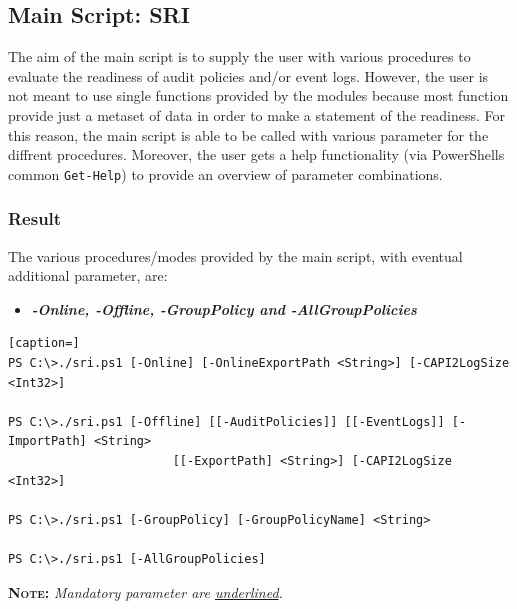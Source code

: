 \clearpage

\subsection{Main Script: SRI}
The aim of the main script is to supply the user with various procedures to evaluate the readiness of audit policies and/or event logs. However, the user is not meant to use single functions provided by the modules because most function provide just a metaset of data in order to make a statement of the readiness. For this reason, the main script is able to be called with various parameter for the diffrent procedures. Moreover, the user gets a help functionality (via PowerShells common \lstinline|Get-Help|) to provide an overview of parameter combinations.
\subsubsection{Result}
The various procedures/modes provided by the main script, with eventual additional parameter, are:
\begin{itemize}
    \item \textbf{\textit{-Online, -Offline, -GroupPolicy and -AllGroupPolicies}}
\end{itemize}
\begin{lstlisting}[caption=]
PS C:\>./sri.ps1 [-Online] [-OnlineExportPath <String>] [-CAPI2LogSize <Int32>]

PS C:\>./sri.ps1 [-Offline] [[-AuditPolicies]] [[-EventLogs]] [-ImportPath] <String> 
                       [[-ExportPath] <String>] [-CAPI2LogSize <Int32>]

PS C:\>./sri.ps1 [-GroupPolicy] [-GroupPolicyName] <String>

PS C:\>./sri.ps1 [-AllGroupPolicies]
\end{lstlisting}
\vspace{0.5cm}
\textsc{\textbf{Note:}}\textit{ Mandatory parameter are \underline{underlined}.}
\vspace{0.5cm}
